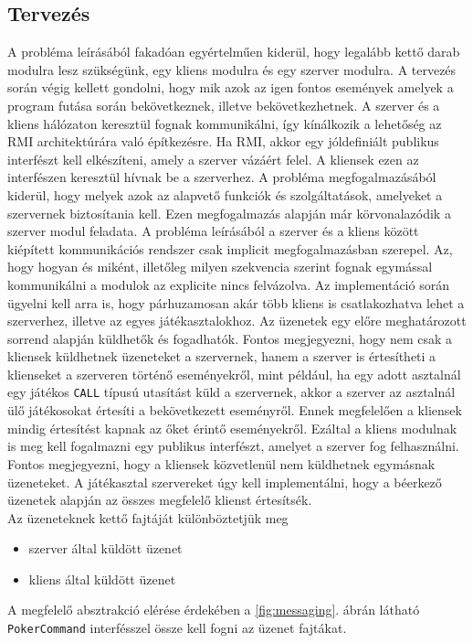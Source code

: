 \subsection{Tervezés}
A probléma leírásából fakadóan egyértelműen kiderül, hogy legalább kettő darab modulra lesz szükségünk, egy kliens modulra és egy szerver modulra. 
A tervezés során végig kellett gondolni, hogy mik azok az igen fontos események amelyek a program futása során bekövetkeznek, illetve bekövetkezhetnek. A szerver és a kliens hálózaton keresztül fognak kommunikálni, így kínálkozik a lehetőség az RMI architektúrára való építkezésre. Ha RMI, akkor egy jóldefiniált publikus interfészt kell elkészíteni, amely a szerver vázáért felel. A kliensek ezen az interfészen keresztül hívnak be a szerverhez. A probléma megfogalmazásából kiderül, hogy melyek azok az alapvető funkciók és szolgáltatások, amelyeket a szervernek biztosítania kell. Ezen megfogalmazás alapján már körvonalazódik a szerver modul feladata. A probléma leírásából a szerver és a kliens között kiépített kommunikációs rendszer csak implicit megfogalmazásban szerepel. Az, hogy hogyan és miként, illetőleg milyen szekvencia szerint fognak egymással kommunikálni a modulok az explicite nincs felvázolva. Az implementáció során ügyelni kell arra is, hogy párhuzamosan akár több kliens is csatlakozhatva lehet a szerverhez, illetve az egyes játékasztalokhoz. Az üzenetek egy előre meghatározott sorrend alapján küldhetők és fogadhatók. Fontos megjegyezni, hogy nem csak a kliensek küldhetnek üzeneteket a szervernek, hanem a szerver is értesítheti a klienseket a szerveren történő eseményekről, mint például, ha egy adott asztalnál egy játékos \texttt{CALL} típusú utasítást küld a szervernek, akkor a szerver az asztalnál ülő játékosokat értesíti a bekövetkezett eseményről. Ennek megfelelően a kliensek mindig értesítést kapnak az őket érintő eseményekről. Ezáltal a kliens modulnak is meg kell fogalmazni egy publikus interfészt, amelyet a szerver fog felhasználni. Fontos megjegyezni, hogy a kliensek közvetlenül nem küldhetnek egymásnak üzeneteket. A játékasztal szervereket úgy kell implementálni, hogy a béerkező üzenetek alapján az összes megfelelő klienst értesítsék. \\
Az üzeneteknek kettő fajtáját különböztetjük meg
 \begin{itemize}[leftmargin=2.7cm]
\item szerver által küldött üzenet
\item kliens által küldött üzenet
\end{itemize}
A megfelelő absztrakció elérése érdekében a \ref{fig:messaging}. ábrán látható \texttt{PokerCommand} interfésszel össze kell fogni az üzenet fajtákat.
